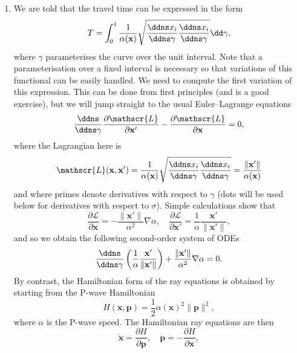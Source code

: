 \documentclass[a4paper,10pt]{paper}
\begin{document}
\begin{enumerate}
\item We are told that the travel time can be expressed in the form
\begin{equation*}
    T=\int_{0}^{1}\frac{1}{\alpha(\mathbf{x})}\sqrt{\frac{\ddns x_{i}}{\ddns\gamma}\frac{\ddns x_{i}}{\ddns\gamma}}\dd\gamma,
\end{equation*}
where $\gamma$ parameterises the curve over the unit interval. Note that a parameterisation over a fixed interval is necessary so that variations of this functional can be easily handled. We need to compute the first variation of this expression. This can be done from first principles (and is a good exercise), but we will jump straight to the usual Euler--Lagrange equations
\begin{equation*}
    \frac{\ddns}{\ddns\gamma}\frac{\partial\mathscr{L}}{\partial \mathbf{x}'}-\frac{\partial\mathscr{L}}{\partial \mathbf{x}}=0,
\end{equation*}
where the Lagrangian here is
\begin{equation*}
    \mathscr{L}(\mathbf{x},\mathbf{x}')=\frac{1}{\alpha(\mathbf{x})}\sqrt{\frac{\ddns x_{i}}{\ddns\gamma}\frac{\ddns x_{i}}{\ddns\gamma}} = \frac{\|\mathbf{x}'\|}{\alpha(\mathbf{x})}
\end{equation*}
and where primes denote derivatives with respect to $\gamma$ (dots will be used below for derivatives with respect to $\sigma$). Simple calculations show that
\begin{equation*}
    \frac{\partial\mathscr{L}}{\partial \mathbf{x}}=-\frac{\|\mathbf{x}'\|}{\alpha^{2}}\nabla\alpha, \quad \frac{\partial\mathscr{L}}{\partial \mathbf{x}'}=\frac{1}{\alpha}\frac{\mathbf{x}'}{\|\mathbf{x}'\|},
\end{equation*}
and so we obtain the following second-order system of ODEs
\begin{equation*}
    \frac{\ddns}{\ddns\gamma}\left(\frac{1}{\alpha}\frac{\mathbf{x}'}{\|\mathbf{x}'\|}\right)+\frac{\|\mathbf{x}'\|}{\alpha^{2}}\nabla\alpha=0.
\end{equation*}
By contrast, the Hamiltonian form of the ray equations is obtained by starting from the P-wave Hamiltonian
\begin{equation*}
    H(\mathbf{x},\mathbf{p})=\frac{1}{2}\alpha(\mathbf{x})^{2}\|\mathbf{p}\|^{2},
\end{equation*}
where $\alpha$ is the P-wave speed. The Hamiltonian ray equations are then
\begin{equation*}
    \dot{\mathbf{x}}=\frac{\partial H}{\partial \mathbf{p}}, \quad \dot{\mathbf{p}}=-\frac{\partial H}{\partial \mathbf{x}},

\end{equation*}
\end{enumerate}
\end{document}
